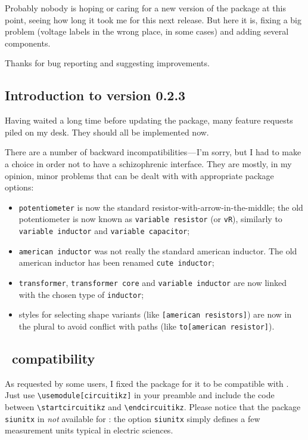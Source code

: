 \documentclass[a4paper]{article}
\begin{document}
Probably nobody is hoping or caring for a new version of the package at this point, seeing how long it took me for this next release. But here it is, fixing a big problem (voltage labels in the wrong place, in some cases) and adding several components.

Thanks for bug reporting and suggesting improvements.

\subsection{Introduction to version 0.2.3}

Having waited a long time before updating the package, many feature requests piled on my desk. They should all be implemented now.

There are a number of backward incompatibilities — I'm sorry, but I had to make a choice in order not to have a schizophrenic interface. They are mostly, in my opinion, minor problems that can be dealt with with appropriate package options:
\begin{itemize}
	\item \texttt{potentiometer} is now the standard resistor-with-arrow-in-the-middle; the old potentiometer is now known as \texttt{variable resistor} (or \texttt{vR}), similarly to \texttt{variable inductor} and \texttt{variable capacitor};
	\item \texttt{american inductor} was not really the standard american inductor. The old american inductor has been renamed \texttt{cute inductor};
	\item \texttt{transformer}, \texttt{transformer core} and \texttt{variable inductor} are now linked with the chosen type of \texttt{inductor};
	\item styles for selecting shape variants (like \texttt{[american resistors]}) are now in the plural to avoid conflict with paths (like \texttt{to[american resistor]}).
\end{itemize}

\subsection{\ConTeXt\ compatibility}

As requested by some users, I fixed the package for it to be compatible with \ConTeXt. Just use \verb!\usemodule[circuitikz]! in your preamble and include the code between \verb!\startcircuitikz! and \verb!\endcircuitikz!. Please notice that the package \texttt{siunitx} in \emph{not} available for \ConTeXt: the option \texttt{siunitx} simply defines a few measurement units typical in electric sciences.
\end{document}
